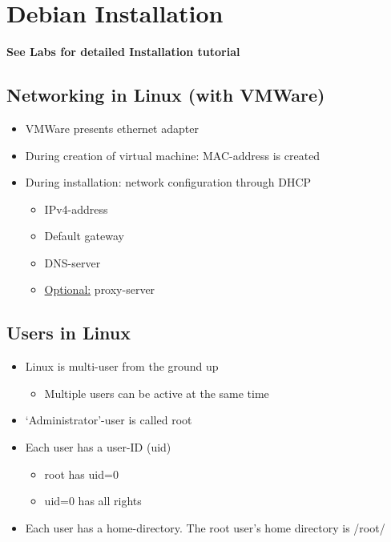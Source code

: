 \documentclass{article}
\begin{document}
\section{Debian Installation}

\textbf{See Labs for detailed Installation tutorial}

\subsection{Networking in Linux (with VMWare)}

\begin{itemize}
    \item VMWare presents ethernet adapter
    \item During creation of virtual machine: MAC-address is created
    \item During installation: network configuration through DHCP
    \begin{itemize}
        \item IPv4-address
        \item Default gateway
        \item DNS-server
        \item \underline{Optional:} proxy-server
    \end{itemize}
\end{itemize}

\subsection{Users in Linux}

\begin{itemize}
    \item Linux is multi-user from the ground up
    \begin{itemize}
        \item Multiple users can be active at the same time
    \end{itemize}
    \item `Administrator'-user is called root
    \item Each user has a user-ID (uid)
    \begin{itemize}
        \item root has uid=0
        \item uid=0 has all rights
    \end{itemize}
    \item Each user has a home-directory. The root user's home directory is /root/
\end{itemize}
\end{document}
